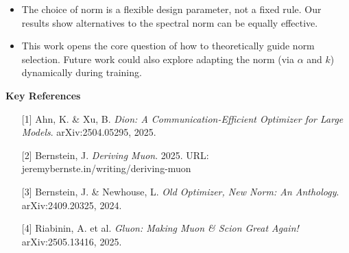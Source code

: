 \documentclass[fontsize=10pt]{beamer}
\begin{document}
\begin{frame}[fragile]
\begin{columns}[T]
\begin{column}{0.30\textwidth}
\begin{itemize}
    \item The choice of norm is a flexible design parameter, not a fixed rule. Our results show alternatives to the spectral norm can be equally effective.

    \item This work opens the core question of how to theoretically guide norm selection. Future work could also explore adapting the norm (via $\alpha$ and $k$) dynamically during training.
\end{itemize}

\vspace{0.5em}
\textbf{\Huge\color{Zen}Key References}\\[0.6em]

\begin{itemize}
   \large
    \setlength{\itemsep}{0pt} %
    \item[{[1]}] Ahn, K. \& Xu, B. \textit{Dion: A Communication-Efficient Optimizer for Large Models}. arXiv:2504.05295, 2025.
    \item[{[2]}] Bernstein, J. \textit{Deriving Muon}. 2025. URL: jeremybernste.in/writing/deriving-muon
    \item[{[3]}] Bernstein, J. \& Newhouse, L. \textit{Old Optimizer, New Norm: An Anthology}. arXiv:2409.20325, 2024.
    \item[{[4]}] Riabinin, A. et al. \textit{Gluon: Making Muon \& Scion Great Again!} arXiv:2505.13416, 2025.
\end{itemize}

\end{column}
\hspace*{0.02\textwidth}%
\end{columns}

\end{frame}
\end{document}
